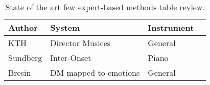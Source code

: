 \begin{table}[ht!]
\centering
  \caption{State of the art few expert-based methods table review.}
  \label{tab:sota_experts}
  \begin{tabular}{  l l l l }
    \hline
	Author & System & Instrument \\ \hline
    KTH & Director Musices & General\\
    Sundberg & Inter-Onset & Piano\\
    Bresin & DM mapped to emotions & General\\
    \hline
  \end{tabular}

\end{table}
